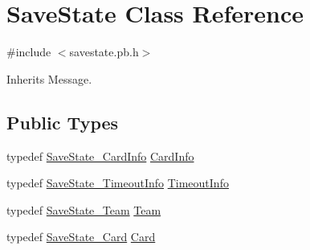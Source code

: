 \hypertarget{class_save_state}{\section{Save\-State Class Reference}
\label{class_save_state}
}


{\ttfamily \#include $<$savestate.\-pb.\-h$>$}



Inherits Message.

\subsection*{Public Types}
\begin{DoxyCompactItemize}
\item 
typedef \hyperlink{class_save_state___card_info}{Save\-State\-\_\-\-Card\-Info} \hyperlink{class_save_state_abde3f0857a29132cb744d13e816210ab}{Card\-Info}
\item 
typedef \hyperlink{class_save_state___timeout_info}{Save\-State\-\_\-\-Timeout\-Info} \hyperlink{class_save_state_a2694fe3d48366ec4922d7b3d91eae0bf}{Timeout\-Info}
\item 
typedef \hyperlink{savestate_8pb_8h_a4b014fc7586e8ed50211fe26dace5b8c}{Save\-State\-\_\-\-Team} \hyperlink{class_save_state_ace00ccb64c1251c8125f66dbb0ef6e17}{Team}
\item 
typedef \hyperlink{savestate_8pb_8h_a3d0d776b2483d298617cad1c15956ec7}{Save\-State\-\_\-\-Card} \hyperlink{class_save_state_aac93841636d6a251481a54747d72a6bb}{Card}
\end{DoxyCompactItemize}
